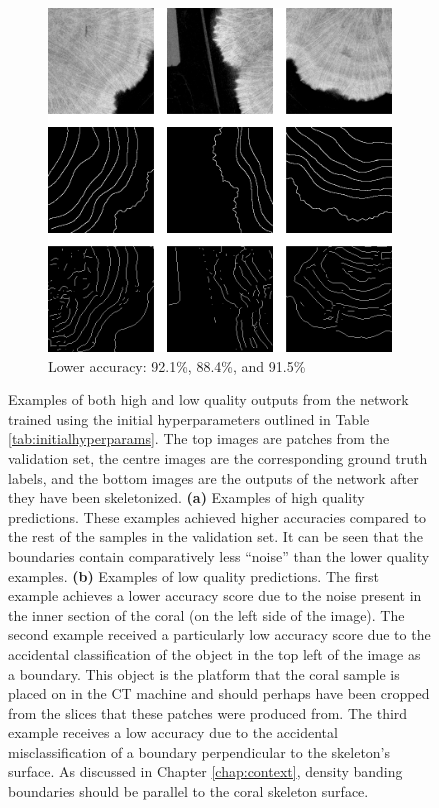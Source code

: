 \begin{figure}[t]
\begin{subfigure}[t]{0.58\textwidth}
        \includegraphics[width=1\textwidth, valign=c]{images/bad-initial.png}
        \caption{Lower accuracy: 92.1\%, 88.4\%, and 91.5\%}
    \end{subfigure}
    \caption{Examples of both high and low quality outputs from the network trained using the initial hyperparameters outlined in Table \ref{tab:initialhyperparams}. The top images are patches from the validation set, the centre images are the corresponding ground truth labels, and the bottom images are the outputs of the network after they have been skeletonized. \textbf{(a)} Examples of high quality predictions. These examples achieved higher accuracies compared to the rest of the samples in the validation set. It can be seen that the boundaries contain comparatively less ``noise'' than the lower quality examples. \textbf{(b)} Examples of low quality predictions. The first example achieves a lower accuracy score due to the noise present in the inner section of the coral (on the left side of the image). The second example received a particularly low accuracy score due to the accidental classification of the object in the top left of the image as a boundary. This object is the platform that the coral sample is placed on in the CT machine and should perhaps have been cropped from the slices that these patches were produced from. The third example receives a low accuracy due to the accidental misclassification of a boundary perpendicular to the skeleton's surface. As discussed in Chapter \ref{chap:context}, density banding boundaries should be parallel to the coral skeleton surface.}
    \label{fig:goodbad}
\end{figure}

